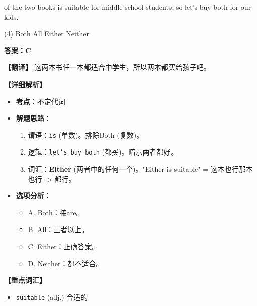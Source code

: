\documentclass[11pt, a4paper]{article}
\newcommand{\analysis}[4]{
    \begin{solutionbox}
        \textbf{答案：#1}
        
        \textbf{【翻译】} #2
        
        \textbf{【详细解析】}
        #3
        
        \textbf{【重点词汇】}
        #4
    \end{solutionbox}
}
\newcommand{\blank}{\underline{\hspace{1.5cm}}}
\begin{document}
\begin{questions}
    \item \blank of the two books is suitable for middle school students, so let's buy both for our kids.
    \begin{tasks}(4)
        \task Both \task All \task Either \task Neither
    \end{tasks}
    \analysis{C}{这两本书任一本都适合中学生，所以两本都买给孩子吧。}{
        \begin{itemize}
            \item \textbf{考点}：不定代词
            \item \textbf{解题思路}：
                \begin{enumerate}
                    \item 谓语：\texttt{is} (单数)。排除Both (复数)。
                    \item 逻辑：\texttt{let's buy both} (都买)。暗示两者都好。
                    \item 词汇：\textbf{Either} (两者中的任何一个)。"Either is suitable" = 这本也行那本也行 -> 都行。
                \end{enumerate}
            \item \textbf{选项分析}：
                \begin{itemize}
                    \item A. Both：接are。
                    \item B. All：三者以上。
                    \item C. Either：正确答案。
                    \item D. Neither：都不适合。
                \end{itemize}
        \end{itemize}
    }{
        \begin{itemize}
            \item \texttt{suitable} (adj.) 合适的
        \end{itemize}
    }


\end{questions}
\end{document}
